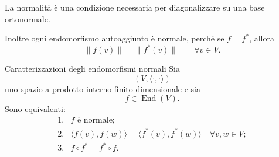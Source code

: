 \documentclass[a4paper]{article}
\begin{document}
\begin{snippetremark}{}
    La normalità è una condizione necessaria per diagonalizzare su una base ortonormale.

    Inoltre ogni endomorfismo autoaggiunto è normale, perché se \(f=f^*\), allora
    \[
        \|f(v)\|=\|f^*(v)\|
        \qquad
        \forall v\in V.
    \]
\end{snippetremark}

\begin{snippetproposition}{Caratterizzazioni degli endomorfismi normali}
    Sia
    \[
        (V,\langle\cdot,\cdot\rangle)
    \]
    uno spazio a prodotto interno finito-dimensionale e sia
    \[
        f\in\operatorname{End}(V).
    \]
    Sono equivalenti:
    \[
        \begin{array}{ll}
            \text{1.} & f \text{ è normale};\\[1mm]
            \text{2.} & \langle f(v),f(w)\rangle=\langle f^*(v),f^*(w)\rangle
            \quad \forall v,w\in V;\\[1mm]
            \text{3.} & f\circ f^*=f^*\circ f.
        \end{array}
    \]
\end{snippetproposition}
\end{document}
